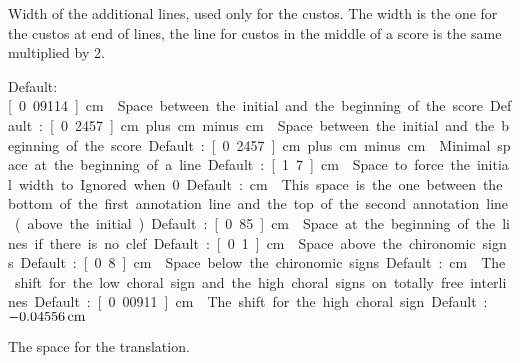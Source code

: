 Width of the additional lines, used only for the custos.  The width is the one for the custos at end of lines, the line for custos in the middle of a score is the same multiplied by 2.  

Default: \unit[0.09114]{cm}

Space between the initial and the beginning of the score.  

Default: \unit[0.2457]{cm} plus \unit[0]{cm} minus \unit[0]{cm}

Space between the initial and the beginning of the score.  

Default: \unit[0.2457]{cm} plus \unit[0]{cm} minus \unit[0]{cm}

Minimal space at the beginning of a line.

Default: \unit[1.7]{cm}

Space to force the initial width to.  Ignored when 0.  

Default: \unit[0]{cm}

This space is the one between the bottom of the first annotation line and the top of the second annotation line (above the initial).  

Default: \unit[0.85]{cm}

Space at the beginning of the lines if there is no clef.  

Default: \unit[0.1]{cm}

Space above the chironomic signs.  

Default: \unit[0.8]{cm}

Space below the chironomic signs.  

Default: \unit[0]{cm}

The shift for the low choral sign and the high choral signs on totally free interlines.  

Default: \unit[0.00911]{cm}

The shift for the high choral sign.  

Default: $\unit[-0.04556]{cm}$

The space for the translation.  

